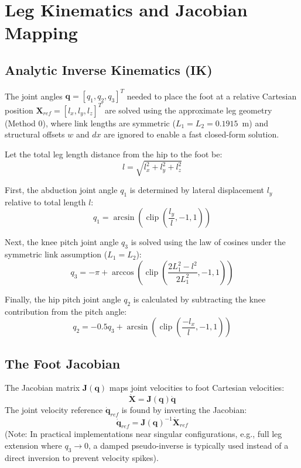 \documentclass[11pt,a4paper]{article}
\begin{document}
\section{Leg Kinematics and Jacobian Mapping}

\subsection{Analytic Inverse Kinematics (IK)}
The joint angles $\mathbf{q} = [q_1, q_2, q_3]^T$ needed to place the foot at a relative Cartesian position $\mathbf{X}_{ref} = [l_x, l_y, l_z]^T$ are solved using the approximate leg geometry (Method 0), where link lengths are symmetric ($L_1 = L_2 = 0.1915$~m) and structural offsets $w$ and $dx$ are ignored to enable a fast closed-form solution.

Let the total leg length distance from the hip to the foot be:
\begin{equation}
l = \sqrt{l_x^2 + l_y^2 + l_z^2}
\end{equation}

First, the abduction joint angle $q_1$ is determined by lateral displacement $l_y$ relative to total length $l$:
\begin{equation}
q_1 = \arcsin\left(\operatorname{clip}\left(\frac{l_y}{l}, -1, 1\right)\right)
\end{equation}

Next, the knee pitch joint angle $q_3$ is solved using the law of cosines under the symmetric link assumption ($L_1 = L_2$):
\begin{equation}
q_3 = -\pi + \arccos\left(\operatorname{clip}\left(\frac{2 L_1^2 - l^2}{2 L_1^2}, -1, 1\right)\right)
\end{equation}

Finally, the hip pitch joint angle $q_2$ is calculated by subtracting the knee contribution from the pitch angle:
\begin{equation}
q_2 = -0.5 q_3 + \arcsin\left(\operatorname{clip}\left(\frac{-l_x}{l}, -1, 1\right)\right)
\end{equation}

\subsection{The Foot Jacobian}
The Jacobian matrix $\mathbf{J}(\mathbf{q})$ maps joint velocities to foot Cartesian velocities:
\begin{equation}
\dot{\mathbf{X}} = \mathbf{J}(\mathbf{q})\dot{\mathbf{q}}
\end{equation}
The joint velocity reference $\dot{\mathbf{q}}_{ref}$ is found by inverting the Jacobian:
\begin{equation}
\dot{\mathbf{q}}_{ref} = \mathbf{J}(\mathbf{q})^{-1} \dot{\mathbf{X}}_{ref}
\end{equation}
(Note: In practical implementations near singular configurations, e.g., full leg extension where $q_3 \to 0$, a damped pseudo-inverse is typically used instead of a direct inversion to prevent velocity spikes).
\end{document}
